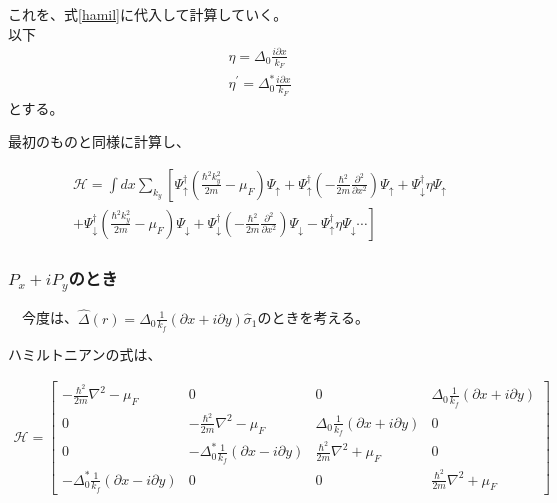 \documentclass{jsarticle}
\begin{document}
            これを、式\eqref{hamil}に代入して計算していく。　\\
    
            以下
            \begin{align}
                \eta=\Delta_0\frac{i\partial x}{k_F} \\
                \eta^{'}=\Delta_0^\ast\frac{i\partial x}{k_F}
            \end{align}
            とする。

            最初のものと同様に計算し、

            \begin{align}
                \mathcal{H}=\int dx \sum_{k_y}
                \left[ \Psi_\uparrow^\dagger \left( \frac{\hbar^2k_y^2}{2m}-\mu_F \right)\Psi_\uparrow
                +\Psi_\uparrow^\dagger \left(- \frac{\hbar^2}{2m}\frac{\partial^2}{\partial x^2}\right)\Psi_\uparrow
                +\Psi_\downarrow^\dagger \eta \Psi_\uparrow \right. \nonumber \\ \left.+
                \Psi_\downarrow^\dagger \left( \frac{\hbar^2k_y^2}{2m}-\mu_F \right)\Psi_\downarrow
                +\Psi_\downarrow^\dagger \left(- \frac{\hbar^2}{2m}\frac{\partial^2}{\partial x^2} \right) \Psi_\downarrow
                -\Psi_\uparrow^\dagger \eta \Psi_\downarrow \cdots
                \right]
                \label{hamil2}
            \end{align}

            \subsubsection{$P_x+iP_y$のとき}
            　今度は、$\hat{\Delta}(r)=\Delta_0\frac{1}{k_f} \left( \partial x+i\partial y \right)\hat{\sigma}_1$のときを考える。

            ハミルトニアンの式は、

            \begin{align}
                \mathcal{H}=
                \begin{bmatrix}
                    -\frac{\hbar^2}{2m}\nabla^2-\mu_F & 0 & 0 & \Delta_0\frac{1}{k_f} \left( \partial x+i\partial y \right) \\
                    0 & -\frac{\hbar^2}{2m}\nabla^2-\mu_F & \Delta_0\frac{1}{k_f} \left( \partial x+i\partial y \right) & 0 \\
                    0 & -\Delta_0^\ast\frac{1}{k_f} \left( \partial x-i\partial y \right) & \frac{\hbar^2}{2m}\nabla^2+\mu_F & 0 \\
                     -\Delta_0^\ast\frac{1}{k_f} \left( \partial x-i\partial y \right) & 0 & 0 & \frac{\hbar^2}{2m}\nabla^2+\mu_F
                \end{bmatrix}
            \end{align}
\end{document}
